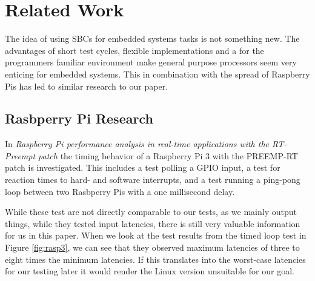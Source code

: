 \chapter{Related Work}
\label{chap:related_work}

The idea of using SBCs for embedded systems tasks is not something new.
The advantages of short test cycles, flexible implementations and a for the programmers familiar environment make general purpose processors seem very enticing for embedded systems.
This in combination with the spread of Raspberry Pis has led to similar research to our paper.

\section{Rasbperry Pi Research}

In \textit{Raspberry Pi performance analysis in real-time applications with the RT-Preempt patch} \cite{Rasp3}
the timing behavior of a Raspberry Pi 3 with the PREEMP-RT patch is investigated.
This includes a test polling a GPIO input,
a test for reaction times to hard- and software interrupts,
and a test running a ping-pong loop between two Rasbperry Pis with a one millisecond delay.

While these test are not directly comparable to our tests, as we mainly output things, while they tested input latencies, there is still very valuable information for us in this paper.
When we look at the test results from the timed loop test in Figure \ref{fig:rasp3}, we can see that they observed maximum latencies of three to eight times the minimum latencies.
If this translates into the worst-case latencies for our testing later it would render the Linux version unsuitable for our goal.


